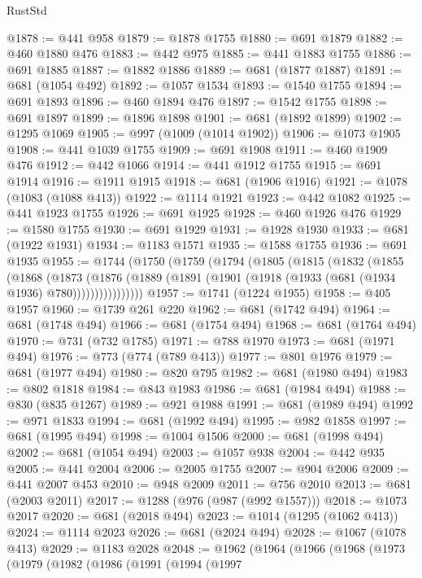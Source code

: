 \begin{lexlean}{RustStd}
\begin{coremodule}
{\begin{coremodule}
{{{{{{{{{{{{{{{{{{{{{{{{{{@1878 := @441 @958
@1879 := @1878 @1755
@1880 := @691 @1879
@1882 := @460 @1880 @476
@1883 := @442 @975
@1885 := @441 @1883 @1755
@1886 := @691 @1885
@1887 := @1882 @1886
@1889 := @681 (@1877 @1887)
@1891 := @681 (@1054 @492)
@1892 := @1057 @1534
@1893 := @1540 @1755
@1894 := @691 @1893
@1896 := @460 @1894 @476
@1897 := @1542 @1755
@1898 := @691 @1897
@1899 := @1896 @1898
@1901 := @681 (@1892 @1899)
@1902 := @1295 @1069
@1905 := @997 (@1009 (@1014 @1902))
@1906 := @1073 @1905
@1908 := @441 @1039 @1755
@1909 := @691 @1908
@1911 := @460 @1909 @476
@1912 := @442 @1066
@1914 := @441 @1912 @1755
@1915 := @691 @1914
@1916 := @1911 @1915
@1918 := @681 (@1906 @1916)
@1921 := @1078 (@1083 (@1088 @413))
@1922 := @1114 @1921
@1923 := @442 @1082
@1925 := @441 @1923 @1755
@1926 := @691 @1925
@1928 := @460 @1926 @476
@1929 := @1580 @1755
@1930 := @691 @1929
@1931 := @1928 @1930
@1933 := @681 (@1922 @1931)
@1934 := @1183 @1571
@1935 := @1588 @1755
@1936 := @691 @1935
@1955 := @1744
    (@1750
      (@1759
        (@1794
          (@1805
            (@1815
              (@1832
                (@1855
                  (@1868
                    (@1873
                      (@1876
                        (@1889 (@1891 (@1901 (@1918 (@1933 (@681 (@1934 @1936) @780))))))))))))))))
@1957 := @1741 (@1224 @1955)
@1958 := @405 @1957
@1960 := @1739 @261 @220
@1962 := @681 (@1742 @494)
@1964 := @681 (@1748 @494)
@1966 := @681 (@1754 @494)
@1968 := @681 (@1764 @494)
@1970 := @731 (@732 @1785)
@1971 := @788 @1970
@1973 := @681 (@1971 @494)
@1976 := @773 (@774 (@789 @413))
@1977 := @801 @1976
@1979 := @681 (@1977 @494)
@1980 := @820 @795
@1982 := @681 (@1980 @494)
@1983 := @802 @1818
@1984 := @843 @1983
@1986 := @681 (@1984 @494)
@1988 := @830 (@835 @1267)
@1989 := @921 @1988
@1991 := @681 (@1989 @494)
@1992 := @971 @1833
@1994 := @681 (@1992 @494)
@1995 := @982 @1858
@1997 := @681 (@1995 @494)
@1998 := @1004 @1506
@2000 := @681 (@1998 @494)
@2002 := @681 (@1054 @494)
@2003 := @1057 @938
@2004 := @442 @935
@2005 := @441 @2004
@2006 := @2005 @1755
@2007 := @904 @2006
@2009 := @441 @2007 @453
@2010 := @948 @2009
@2011 := @756 @2010
@2013 := @681 (@2003 @2011)
@2017 := @1288 (@976 (@987 (@992 @1557)))
@2018 := @1073 @2017
@2020 := @681 (@2018 @494)
@2023 := @1014 (@1295 (@1062 @413))
@2024 := @1114 @2023
@2026 := @681 (@2024 @494)
@2028 := @1067 (@1078 @413)
@2029 := @1183 @2028
@2048 := @1962
    (@1964
      (@1966
        (@1968
          (@1973
            (@1979
              (@1982
                (@1986
                  (@1991
                    (@1994
                      (@1997
}}}}}}}}}}}}}}}}}}}}}}}}}}
\end{coremodule}}
\end{coremodule}
\end{lexlean}
